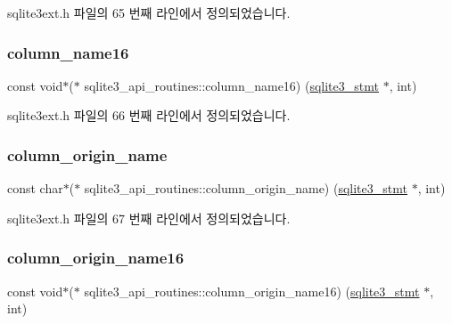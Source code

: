 sqlite3ext.\+h 파일의 65 번째 라인에서 정의되었습니다.

\mbox{\label{structsqlite3__api__routines_a14ff9b029639553e11e610281097dfc7}} 
\subsubsection{\texorpdfstring{column\+\_\+name16}{column\_name16}}
{\footnotesize\ttfamily const void$\ast$($\ast$ sqlite3\+\_\+api\+\_\+routines\+::column\+\_\+name16) (\hyperlink{sqlite3_8h_af2a033da1327cdd77f0a174a09aedd0c}{sqlite3\+\_\+stmt} $\ast$, int)}



sqlite3ext.\+h 파일의 66 번째 라인에서 정의되었습니다.

\mbox{\label{structsqlite3__api__routines_a944609a2b514a9002e3c76575ad3bd65}} 
\subsubsection{\texorpdfstring{column\+\_\+origin\+\_\+name}{column\_origin\_name}}
{\footnotesize\ttfamily const char$\ast$($\ast$ sqlite3\+\_\+api\+\_\+routines\+::column\+\_\+origin\+\_\+name) (\hyperlink{sqlite3_8h_af2a033da1327cdd77f0a174a09aedd0c}{sqlite3\+\_\+stmt} $\ast$, int)}



sqlite3ext.\+h 파일의 67 번째 라인에서 정의되었습니다.

\mbox{\label{structsqlite3__api__routines_a29f148c32e2e8aba50d3ff3ffd8c4f90}} 
\subsubsection{\texorpdfstring{column\+\_\+origin\+\_\+name16}{column\_origin\_name16}}
{\footnotesize\ttfamily const void$\ast$($\ast$ sqlite3\+\_\+api\+\_\+routines\+::column\+\_\+origin\+\_\+name16) (\hyperlink{sqlite3_8h_af2a033da1327cdd77f0a174a09aedd0c}{sqlite3\+\_\+stmt} $\ast$, int)}



